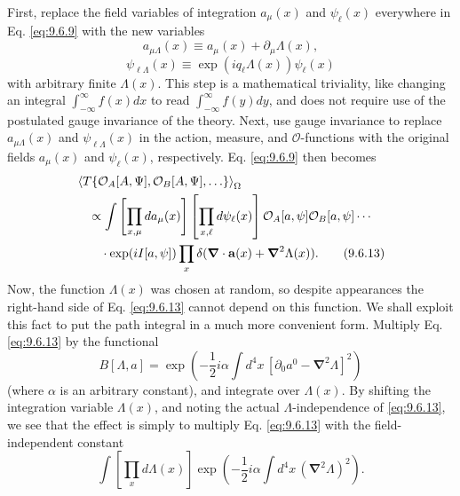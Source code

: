 First, replace the field variables of integration $a_\mu(x)$ and $\psi_\ell(x)$
everywhere in Eq. \eqref{eq:9.6.9} with the new variables
\begin{equation}
a_{\mu\Lambda}(x)\equiv a_\mu(x)+\partial_\mu\Lambda(x),
\tag{9.6.11}\label{eq:9.6.11}
\end{equation}
\begin{equation}
\psi_{\ell\Lambda}(x)\equiv
 \exp(iq_\ell\Lambda(x))\psi_\ell(x)
\tag{9.6.12}\label{eq:9.6.12}
\end{equation}
with arbitrary finite $\Lambda(x)$. This step is a mathematical triviality,
like changing an integral $\int_{-\infty}^{\infty}f(x)dx$ to read
$\int_{-\infty}^{\infty}f(y)dy$, and does not require use of the postulated
gauge invariance of the theory. Next, use gauge invariance to replace
$a_{\mu\Lambda}(x)$ and $\psi_{\ell\Lambda}(x)$ in the action, measure, and
$\mathcal O$-functions with the original fields $a_\mu(x)$ and $\psi_\ell(x)$,
respectively. Eq. \eqref{eq:9.6.9} then becomes
\begin{align}
&\left\langle T\{\mathcal O_A[A,\Psi],\mathcal O_B[A,\Psi],\ldots\}
 \right\rangle_{\Omega}
\notag\\
&\quad\propto\int\left[\prod_{x,\mu}da_\mu(x)\right]
 \left[\prod_{x,\ell}d\psi_\ell(x)\right]
 \mathcal O_A[a,\psi]\mathcal O_B[a,\psi]\cdots
\notag\\
&\qquad\cdot\exp(iI[a,\psi])
 \prod_x\delta(\boldsymbol\nabla\cdot\mathbf a(x)
 +\boldsymbol\nabla^2\Lambda(x)).
\tag{9.6.13}\label{eq:9.6.13}
\end{align}
Now, the function $\Lambda(x)$ was chosen at random, so despite appearances the
right-hand side of Eq. \eqref{eq:9.6.13} cannot depend on this function. We shall exploit
this fact to put the path integral in a much more convenient form. Multiply
Eq. \eqref{eq:9.6.13} by the functional
\begin{equation}
B[\Lambda,a]=\exp\left(-\frac12i\alpha\int d^4x\,
 [\partial_0a^0-\boldsymbol\nabla^2\Lambda]^2\right)
\tag{9.6.14}\label{eq:9.6.14}
\end{equation}
(where $\alpha$ is an arbitrary constant), and integrate over $\Lambda(x)$.
By shifting the integration variable $\Lambda(x)$, and noting the actual
$\Lambda$-independence of \eqref{eq:9.6.13}, we see that the effect is simply to
multiply Eq. \eqref{eq:9.6.13} with the field-independent constant
\begin{equation}
\int\left[\prod_xd\Lambda(x)\right]
 \exp\left(-\frac12i\alpha\int d^4x\,
 (\boldsymbol\nabla^2\Lambda)^2\right).
\tag{9.6.15}\label{eq:9.6.15}
\end{equation}
